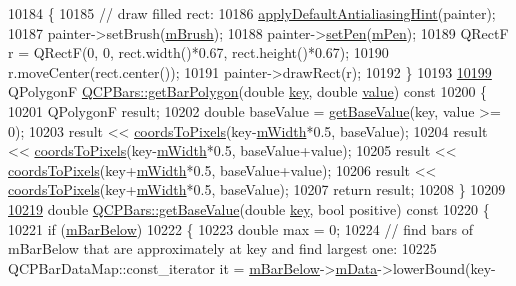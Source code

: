 \begin{DoxyCode}
10184 \textcolor{keyword}{}\{
10185   \textcolor{comment}{// draw filled rect:}
10186   \hyperlink{a00024_a76e9d6cc7972dc1528f526d163766aca}{applyDefaultAntialiasingHint}(painter);
10187   painter->setBrush(\hyperlink{a00024_a33f00674c0161c13315ab9da0895418e}{mBrush});
10188   painter->\hyperlink{a00047_af9c7a4cd1791403901f8c5b82a150195}{setPen}(\hyperlink{a00024_a67bc0622fd1b9fa14e54c14922dcec66}{mPen});
10189   QRectF r = QRectF(0, 0, rect.width()*0.67, rect.height()*0.67);
10190   r.moveCenter(rect.center());
10191   painter->drawRect(r);
10192 \}
10193 
\hypertarget{a00115_source_l10199}{}\hyperlink{a00027_a1d118a76662cfd691a78c6f573e3f78c}{10199} QPolygonF \hyperlink{a00027_a1d118a76662cfd691a78c6f573e3f78c}{QCPBars::getBarPolygon}(\textcolor{keywordtype}{double} \hyperlink{a00116_a94bb892c30911cd62cba0707a5395be4}{key}, \textcolor{keywordtype}{double} 
      \hyperlink{a00116_aee90379adb0307effb138f4871edbc5c}{value})\textcolor{keyword}{ const}
10200 \textcolor{keyword}{}\{
10201   QPolygonF result;
10202   \textcolor{keywordtype}{double} baseValue = \hyperlink{a00027_ab60a3c4b8e7c59f0f14e25590d96fa4e}{getBaseValue}(key, value >= 0);
10203   result << \hyperlink{a00024_ade710a776104b14c1c835168ce1bfc5c}{coordsToPixels}(key-\hyperlink{a00027_a7c4e0f2246f8133f48a9c3f24cf5b920}{mWidth}*0.5, baseValue);
10204   result << \hyperlink{a00024_ade710a776104b14c1c835168ce1bfc5c}{coordsToPixels}(key-\hyperlink{a00027_a7c4e0f2246f8133f48a9c3f24cf5b920}{mWidth}*0.5, baseValue+value);
10205   result << \hyperlink{a00024_ade710a776104b14c1c835168ce1bfc5c}{coordsToPixels}(key+\hyperlink{a00027_a7c4e0f2246f8133f48a9c3f24cf5b920}{mWidth}*0.5, baseValue+value);
10206   result << \hyperlink{a00024_ade710a776104b14c1c835168ce1bfc5c}{coordsToPixels}(key+\hyperlink{a00027_a7c4e0f2246f8133f48a9c3f24cf5b920}{mWidth}*0.5, baseValue);
10207   \textcolor{keywordflow}{return} result;
10208 \}
10209 
\hypertarget{a00115_source_l10219}{}\hyperlink{a00027_ab60a3c4b8e7c59f0f14e25590d96fa4e}{10219} \textcolor{keywordtype}{double} \hyperlink{a00027_ab60a3c4b8e7c59f0f14e25590d96fa4e}{QCPBars::getBaseValue}(\textcolor{keywordtype}{double} \hyperlink{a00116_a94bb892c30911cd62cba0707a5395be4}{key}, \textcolor{keywordtype}{bool} positive)\textcolor{keyword}{ const}
10220 \textcolor{keyword}{}\{
10221   \textcolor{keywordflow}{if} (\hyperlink{a00027_a02eb7de7a2c03dc5699f329bb1c5f6e1}{mBarBelow})
10222   \{
10223     \textcolor{keywordtype}{double} max = 0;
10224     \textcolor{comment}{// find bars of mBarBelow that are approximately at key and find largest one:}
10225     QCPBarDataMap::const\_iterator it = \hyperlink{a00027_a02eb7de7a2c03dc5699f329bb1c5f6e1}{mBarBelow}->\hyperlink{a00027_aef28d29d51ef84b608ecd22c55d531ff}{mData}->lowerBound(key-

\end{DoxyCode}
